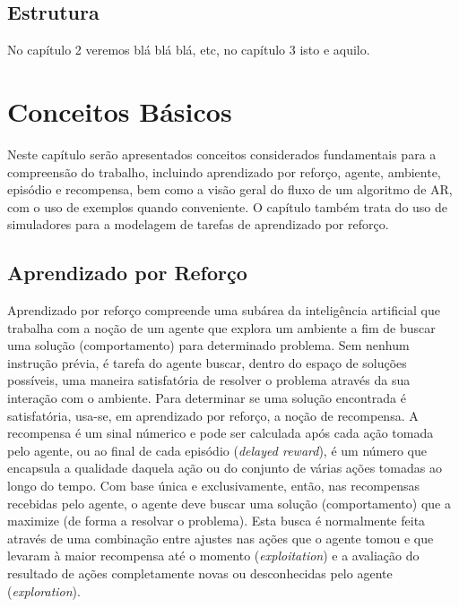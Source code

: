 \documentclass[cic,tc]{iiufrgs}
\begin{document}
\section{Estrutura}
No capítulo 2 veremos blá blá blá, etc, no capítulo 3 isto e aquilo.


\chapter{Conceitos Básicos}
Neste capítulo serão apresentados conceitos considerados fundamentais para a compreensão do trabalho, incluindo aprendizado por
reforço, agente, ambiente, episódio e recompensa, bem como a visão geral do fluxo de um algoritmo de AR, com o uso de exemplos quando conveniente.
O capítulo também trata do uso de simuladores para a modelagem de tarefas de aprendizado por reforço.


\section{Aprendizado por Reforço}
Aprendizado por reforço compreende uma subárea da inteligência artificial que trabalha com a noção de um agente que explora um ambiente
a fim de buscar uma solução (comportamento) para determinado problema. Sem nenhum instrução prévia, é tarefa do agente buscar, dentro do espaço
de soluções possíveis, uma maneira satisfatória de resolver o problema através da sua interação com o ambiente.
Para determinar se uma solução encontrada é satisfatória, usa-se, em aprendizado por reforço, a noção de recompensa. A recompensa é um sinal númerico e pode ser calculada após cada ação tomada pelo agente, ou ao final de cada episódio (\textit{delayed reward}), é um número que encapsula a
qualidade daquela ação ou do conjunto de várias ações tomadas ao longo do tempo. Com base única e exclusivamente, então, nas recompensas recebidas pelo agente,
o agente deve buscar uma solução (comportamento) que a maximize (de forma a resolvar o problema). Esta busca  é normalmente feita através
de uma combinação entre ajustes nas ações que o agente tomou e que levaram à maior recompensa até o momento (\textit{exploitation}) e a avaliação do resultado de ações completamente
novas ou desconhecidas pelo agente (\textit{exploration}).
\end{document}

